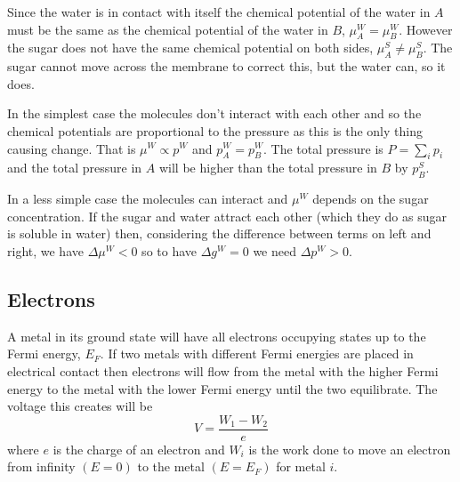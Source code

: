     Since the water is in contact with itself the chemical potential of the water in \(A\) must be the same as the chemical potential of the water in \(B\), \(\mu_A^W = \mu_B^W\).
    However the sugar does not have the same chemical potential on both sides, \(\mu_A^S \ne \mu_B^S\).
    The sugar cannot move across the membrane to correct this, but the water can, so it does.
    
    In the simplest case the molecules don't interact with each other and so the chemical potentials are proportional to the pressure as this is the only thing causing change.
    That is \(\mu^W \propto p^W\) and \(p_A^W = p_B^W\).
    The total pressure is \(P = \sum_i p_i\) and the total pressure in \(A\) will be higher than the total pressure in \(B\) by \(p_B^S\).
    
    In a less simple case the molecules can interact and \(\mu^W\) depends on the sugar concentration.
    If the sugar and water attract each other (which they do as sugar is soluble in water) then, considering the difference between terms on left and right, we have \(\Delta\mu^W < 0\) so to have \(\Delta g^W = 0\) we need \(\Delta p^W > 0\).
    
    \subsection{Electrons}
    A metal in its ground state will have all electrons occupying states up to the Fermi energy, \(E_F\).
    If two metals with different Fermi energies are placed in electrical contact then electrons will flow from the metal with the higher Fermi energy to the metal with the lower Fermi energy until the two equilibrate.
    The voltage this creates will be
    \[V = \frac{W_1 - W_2}{e}\]
    where \(e\) is the charge of an electron and \(W_i\) is the work done to move an electron from infinity \((E = 0)\) to the metal \((E = E_F)\) for metal \(i\).
    
